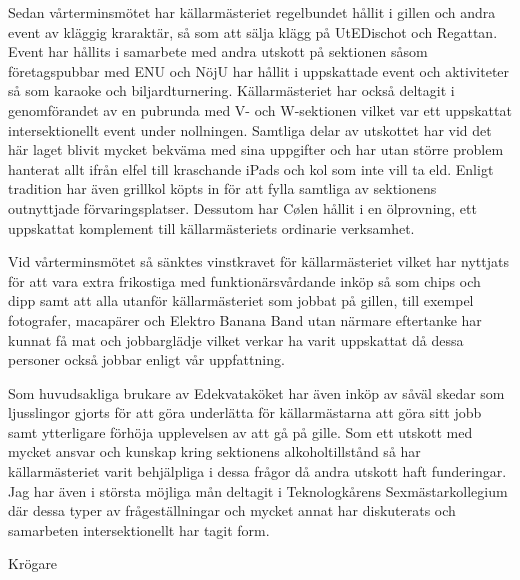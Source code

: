 \documentclass[../_main/handlingar.tex]{subfiles}
\begin{document}
\vspace{8px}

Sedan vårterminsmötet har källarmästeriet regelbundet hållit i gillen och andra event av kläggig kraraktär, så som att sälja klägg på UtEDischot och Regattan. Event har hållits i samarbete med andra utskott på sektionen såsom företagspubbar med ENU och NöjU har hållit i uppskattade event och aktiviteter så som karaoke och biljardturnering. Källarmästeriet har också deltagit i genomförandet av en pubrunda med V- och W-sektionen vilket var ett uppskattat intersektionellt event under nollningen. Samtliga delar av utskottet har vid det här laget blivit mycket bekväma med sina uppgifter och har utan större problem hanterat allt ifrån elfel till kraschande iPads och kol som inte vill ta eld. Enligt tradition har även grillkol köpts in för att fylla samtliga av sektionens outnyttjade förvaringsplatser. Dessutom har Cølen hållit i en ölprovning, ett uppskattat komplement till källarmästeriets ordinarie verksamhet. 

Vid vårterminsmötet så sänktes vinstkravet för källarmästeriet vilket har nyttjats för att vara extra frikostiga med funktionärsvårdande inköp så som chips och dipp samt att alla utanför källarmästeriet som jobbat på gillen, till exempel fotografer, macapärer och Elektro Banana Band utan närmare eftertanke har kunnat få mat och jobbarglädje vilket verkar ha varit uppskattat då dessa personer också jobbar enligt vår uppfattning. 

Som huvudsakliga brukare av Edekvataköket har även inköp av såväl skedar som ljusslingor gjorts för att göra underlätta för källarmästarna att göra sitt jobb samt ytterligare förhöja upplevelsen av att gå på gille. Som ett utskott med mycket ansvar och kunskap kring sektionens alkoholtillstånd så har källarmästeriet varit behjälpliga i dessa frågor då andra utskott haft funderingar.  Jag har även i största möjliga mån deltagit i Teknologkårens Sexmästarkollegium där dessa typer av frågeställningar och mycket annat har diskuterats och samarbeten intersektionellt har tagit form. 


\begin{signatures}{1}
    \mvh
    \signature{Davida Åström}{Krögare}
\end{signatures}
\end{document}
